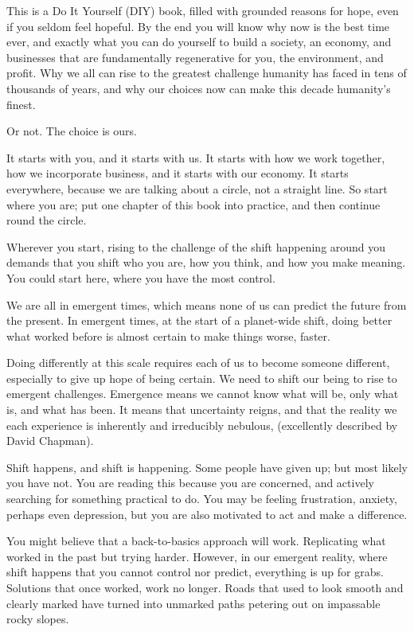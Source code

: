 This is a Do It Yourself (DIY) book, filled with grounded reasons for hope, even if you seldom feel hopeful. By the end you will know why now is the best time ever, and exactly what you can do yourself to build a society, an economy, and businesses that are fundamentally regenerative for you, the environment, and profit. Why we all can rise to the greatest challenge humanity has faced in tens of thousands of years, and why our choices now can make this decade humanity's finest. 


Or not. The choice is ours.


It starts with you, and it starts with us. It starts with how we work together, how we incorporate business, and it starts with our economy. It starts everywhere, because we are talking about a circle, not a straight line. So start where you are; put one chapter of this book into practice, and then continue round the circle. 


Wherever you start, rising to the challenge of the shift happening around you demands that you shift who you are, how you think, and how you make meaning. You could start here, where you have the most control.


We are all in emergent times, which means none of us can predict the future from the present. In emergent times, at the start of a planet-wide shift, doing better what worked before is almost certain to make things worse, faster.


Doing differently at this scale requires each of us to become someone different, especially to give up hope of being certain. We need to shift our being to rise to emergent challenges. Emergence means we cannot know what will be, only what is, and what has been. It means that uncertainty reigns, and that the reality we each experience is inherently and irreducibly nebulous, (excellently described by David Chapman\cite{chapman-meaningness-nebulosity}). 


Shift happens, and shift is happening. Some people have given up; but most likely you have not. You are reading this because you are concerned, and actively searching for something practical to do. You may be feeling frustration, anxiety, perhaps even depression, but you are also motivated to act and make a difference.


You might believe that a back-to-basics approach will work. Replicating what worked in the past but trying harder. However, in our emergent reality, where shift happens that you cannot control nor predict, everything is up for grabs. Solutions that once worked, work no longer. Roads that used to look smooth and clearly marked have turned into unmarked paths petering out on impassable rocky slopes.


